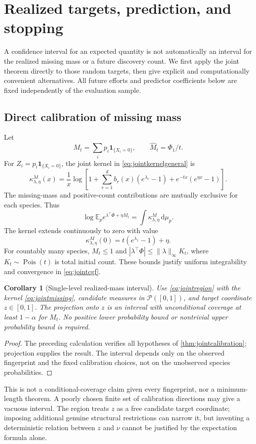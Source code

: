 \documentclass[11pt]{article}
\numberwithin{equation}{section}
\newtheorem{corollary}[corollary]{Corollary}
\theoremstyle{definition}
\theoremstyle{remark}
\newcommand{\E}{\mathbb E}
\newcommand{\ind}{\mathbf1}
\newcommand{\Prob}{\mathcal P}
\newcommand{\Pois}{\operatorname{Pois}}
\newcommand{\dd}{\,\mathrm d}
\begin{document}
\section{Realized targets, prediction, and stopping}\label{sec:errors}
A confidence interval for an expected quantity is not automatically an interval for the realized missing mass or a future discovery count. We first apply the joint theorem directly to those random targets, then give explicit and computationally convenient alternatives. All future efforts and predictor coefficients below are fixed independently of the evaluation sample.

\subsection{Direct calibration of missing mass}\label{subsec:jointmissing}
Let
\[
 M_t=\sum_i p_i\ind_{\{X_i=0\}},\qquad \widehat M_t=\Phi_1/t.
\]
For $Z_i=p_i\ind_{\{X_i=0\}}$, the joint kernel in \eqref{eq:jointkernelgeneral} is
\begin{equation}\label{eq:jointmissing}
 \kappa^M_{\lambda,\eta}(x)
 =\frac1x\log\left[
 1+\sum_{r=1}^d b_r(x)(e^{\lambda_r}-1)
       +e^{-tx}(e^{\eta x}-1)\right].
\end{equation}
The missing-mass and positive-count contributions are mutually exclusive for each species. Thus
\[
 \log\E_p e^{\lambda^\top\Phi+\eta M_t}
 =\int\kappa^M_{\lambda,\eta}\dd\mu_p.
\]
The kernel extends continuously to zero with value
\begin{equation}\label{eq:missinglimit}
 \kappa^M_{\lambda,\eta}(0)=t(e^{\lambda_1}-1)+\eta.
\end{equation}
For countably many species, $M_t\le1$ and $|\lambda^\top\Phi|\le\|\lambda\|_\infty K_t$, where $K_t\sim\Pois(t)$ is total initial count. These bounds justify uniform integrability and convergence in \eqref{eq:jointcgf}.

\begin{corollary}[Single-level realized-mass interval]\label{cor:jointmissing}
Use \eqref{eq:jointregion} with the kernel \eqref{eq:jointmissing}, candidate measures in $\Prob([0,1])$, and target coordinate $z\in[0,1]$. The projection onto $z$ is an interval with unconditional coverage at least $1-\alpha$ for $M_t$. No positive lower probability bound or nontrivial upper probability bound is required.
\end{corollary}
\begin{proof}
The preceding calculation verifies all hypotheses of \cref{thm:jointcalibration}; projection supplies the result. The interval depends only on the observed fingerprint and the fixed calibration choices, not on the unobserved species probabilities.
\end{proof}
This is not a conditional-coverage claim given every fingerprint, nor a minimum-length theorem. A poorly chosen finite set of calibration directions may give a vacuous interval. The region treats $z$ as a free candidate target coordinate; imposing additional genuine structural restrictions can narrow it, but inventing a deterministic relation between $z$ and $\nu$ cannot be justified by the expectation formula alone.
\end{document}
